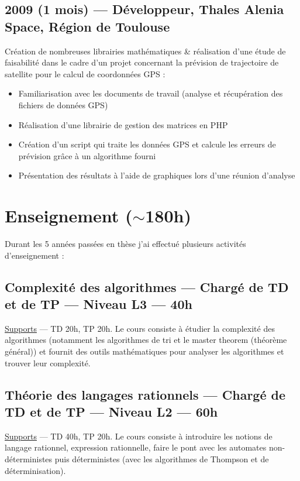 \documentclass[11pt,a4paper,sans]{article} %
\begin{document}
\subsection{2009 (1 mois) --- Développeur, Thales Alenia Space, Région de Toulouse}
Création de nombreuses librairies mathématiques \& réalisation d'une étude de faisabilité dans le cadre d'un projet
concernant la prévision de trajectoire de satellite pour le calcul de coordonnées GPS :
\begin{itemize}
  \item Familiarisation avec les documents de travail (analyse et récupération des fichiers de données GPS)
  \item Réalisation d'une librairie de gestion des matrices en PHP
  \item Création d'un script qui traite les données GPS et calcule les erreurs de prévision grâce à un algorithme fourni
  \item Présentation des résultats à l'aide de graphiques lors d'une réunion d'analyse
\end{itemize}


\section{Enseignement (\(\sim\)180h)}

Durant les 5 années passées en thèse j'ai effectué plusieurs activités d'enseignement :

\subsection{Complexité des algorithmes --- Chargé de TD et de TP --- Niveau L3 --- 40h}

\href{https://www.lrde.epita.fr/~adl/ens/cpxa}{Supports} --- TD 20h, TP 20h. Le  cours consiste à étudier la complexité
des algorithmes (notamment les algorithmes de tri et le master theorem (théorème général)) et fournit des outils
mathématiques pour analyser les algorithmes et trouver leur complexité.

\subsection{Théorie des langages rationnels --- Chargé de TD et de TP --- Niveau L2 --- 60h}

\href{http://jo.fabrizio.free.fr/teaching/thlr/}{Supports} --- TD 40h, TP 20h. Le cours consiste à introduire les
notions de langage rationnel, expression rationnelle, faire le pont avec les automates non-déterministes puis
déterministes (avec les algorithmes de Thompson et de déterminisation).
\end{document}
